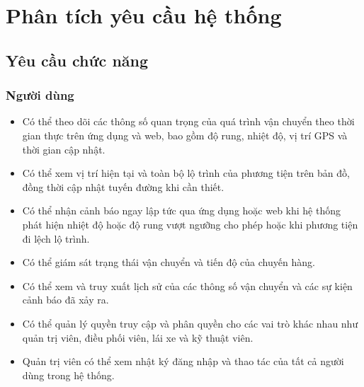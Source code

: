\chapter{Phân tích yêu cầu hệ thống}
\section{Yêu cầu chức năng}
\subsection{Người dùng}
\begin{itemize}
    \item Có thể theo dõi các thông số quan trọng của quá trình vận chuyển theo thời gian thực trên ứng dụng và web, bao gồm độ rung, nhiệt độ, vị trí GPS và thời gian cập nhật.
    \item Có thể xem vị trí hiện tại và toàn bộ lộ trình của phương tiện trên bản đồ, đồng thời cập nhật tuyến đường khi cần thiết.
    \item Có thể nhận cảnh báo ngay lập tức qua ứng dụng hoặc web khi hệ thống phát hiện nhiệt độ hoặc độ rung vượt ngưỡng cho phép hoặc khi phương tiện đi lệch lộ trình.
    \item Có thể giám sát trạng thái vận chuyển và tiến độ của chuyến hàng.
    \item Có thể xem và truy xuất lịch sử của các thông số vận chuyển và các sự kiện cảnh báo đã xảy ra.
    \item Có thể quản lý quyền truy cập và phân quyền cho các vai trò khác nhau như quản trị viên, điều phối viên, lái xe và kỹ thuật viên.
    \item Quản trị viên có thể xem nhật ký đăng nhập và thao tác của tất cả người dùng trong hệ thống.
\end{itemize}

